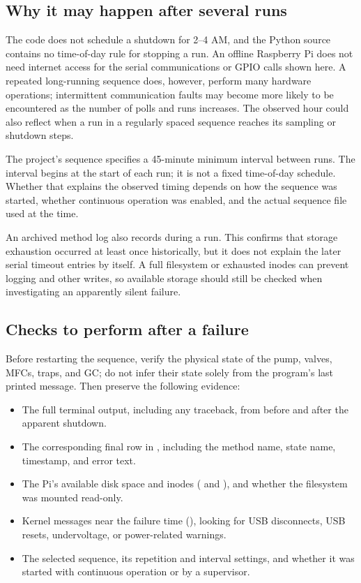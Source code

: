 \subsection{Why it may happen after several runs}

The code does not schedule a shutdown for 2--4 AM, and the Python source
contains no time-of-day rule for stopping a run. An offline Raspberry Pi
does not need internet access for the serial communications or GPIO calls
shown here. A repeated long-running sequence does, however, perform many
hardware operations; intermittent communication faults may become more
likely to be encountered as the number of polls and runs increases. The
observed hour could also reflect when a run in a regularly spaced sequence
reaches its sampling or shutdown steps.

The project's  sequence specifies a 45-minute minimum interval
between runs. The interval begins at the start of each run; it is not a
fixed time-of-day schedule. Whether that explains the observed timing depends
on how the sequence was started, whether continuous operation was enabled,
and the actual sequence file used at the time.

An archived method log also records  during a run. This confirms that storage exhaustion occurred at
least once historically, but it does not explain the later serial timeout
entries by itself. A full filesystem or exhausted inodes can prevent logging
and other writes, so available storage should still be checked when
investigating an apparently silent failure.

\subsection{Checks to perform after a failure}

Before restarting the sequence, verify the physical state of the pump,
valves, MFCs, traps, and GC; do not infer their state solely from the
program's last printed message. Then preserve the following evidence:
\begin{itemize}
    \item The full terminal output, including any traceback, from before and
    after the apparent shutdown.
    \item The corresponding final row in , including
    the method name, state name, timestamp, and error text.
    \item The Pi's available disk space and inodes ( and
    ), and whether the filesystem was mounted read-only.
    \item Kernel messages near the failure time (), looking for
    USB disconnects, USB resets, undervoltage, or power-related warnings.
    \item The selected sequence, its repetition and interval settings, and
    whether it was started with continuous operation or by a supervisor.
\end{itemize}

